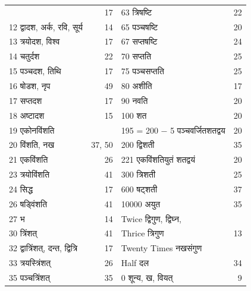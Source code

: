 \documentclass[]{article}
\begin{document}
{{\begin{tabular}{lr|lr}
 & 17 & 63 
 त्रिषष्टि 
 & 22\\
12 
द्वादश, अर्क, रवि, सूर्य 
 & 14 & 65 
 पञ्चषष्टि 
 & 20\\
13 
त्रयोदश, विश्व 
 & 17 & 67 
 सप्तषष्टि 
 & 24\\
14 
चतुर्दश 
 & 22 & 70 
 सप्तति 
 & 25\\
15 
पञ्चदश, तिथि 
 & 17 & 75 
 पञ्चसप्तति 
 & 25\\
16 
षोडश, नृप 
 & 49 & 80 
 अशीति 
 & 17\\
17 
सप्तदश 
 & 17 & 90 
 नवति 
 & 20\\
18
अष्टादश 
 & 15 & 100 
 शत 
 & 20\\
19
एकोनविंशति
 &  & 
195 = 200 $-$ 5 पञ्चवर्जितशतद्वय 
 & 20\\
20 
विंशति, नख
 & 37, 50 & 
200 द्विशती 
 & 35\\
21 
एकविंशति 
 & 26 & 221
 एकविंशतियुतं शतद्वयं 
 & 20 \\
23 
त्रयोविंशति 
 & 41 & 300
 त्रिशती 
 & 25\\
24 
सिद्ध 
 & 17 & 600  षट्शती 
 & 37 \\
26 
	षड्विंशति 
 & 41 & 10000 
अयुत 
 & 35 \\
27 
 भ 
 & 14 & Twice 
द्विगुण, द्विघ्न,
 & \\
30 
	त्रिंशत् 
 & 41 & Thrice 
त्रिगुण 
 & 13\\
32
	द्वात्रिंशत्, दन्त, द्वित्रि 
 & 17 & Twenty Times 
नखसंगुण
 & \\
33
	त्रयस्त्रिंशत् 
 & 26 & Half 
दल 
 & 34\\
35
	पञ्चत्रिंशत् 
 & 35 &  0
शून्य, ख, वियत्
 & 9\\
  
\end{tabular}
}}
\end{document}
